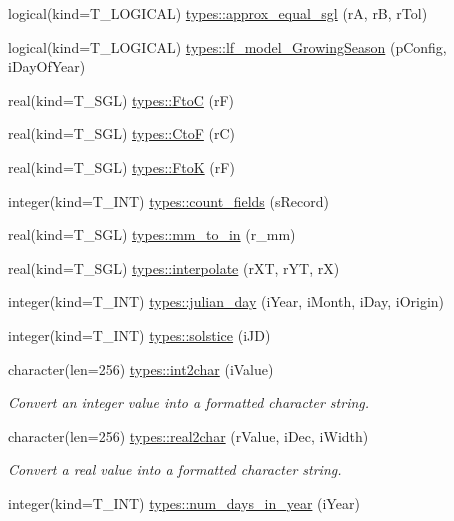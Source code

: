 \begin{DoxyCompactItemize}
\item 
logical(kind=T\_\-LOGICAL) \hyperlink{namespacetypes_a60490ed5b6b7d5903a034d5e531538db}{types::approx\_\-equal\_\-sgl} (rA, rB, rTol)
\item 
logical(kind=T\_\-LOGICAL) \hyperlink{namespacetypes_ae89a23df854f9f89cad1ced3667b267a}{types::lf\_\-model\_\-GrowingSeason} (pConfig, iDayOfYear)
\item 
real(kind=T\_\-SGL) \hyperlink{namespacetypes_a1ac08c4c46c18fd254270b91881836cd}{types::FtoC} (rF)
\item 
real(kind=T\_\-SGL) \hyperlink{namespacetypes_adc61e2bd06f7763a41664635cd792fa8}{types::CtoF} (rC)
\item 
real(kind=T\_\-SGL) \hyperlink{namespacetypes_a6d9d8e8b7f4594406e117e925a28ed71}{types::FtoK} (rF)
\item 
integer(kind=T\_\-INT) \hyperlink{namespacetypes_afb2b5df966d0995a0ef41180e05a0dc1}{types::count\_\-fields} (sRecord)
\item 
real(kind=T\_\-SGL) \hyperlink{namespacetypes_a6656bdb69c63e89fc6a5a56171dab67b}{types::mm\_\-to\_\-in} (r\_\-mm)
\item 
real(kind=T\_\-SGL) \hyperlink{namespacetypes_a7099d6b490c7a33120d4d9976142f72c}{types::interpolate} (rXT, rYT, rX)
\item 
integer(kind=T\_\-INT) \hyperlink{namespacetypes_a5f9e09099f47bada40db4475ee5778ae}{types::julian\_\-day} (iYear, iMonth, iDay, iOrigin)
\item 
integer(kind=T\_\-INT) \hyperlink{namespacetypes_a9b6e5619a6384f5bf6c383f273414f55}{types::solstice} (iJD)
\item 
character(len=256) \hyperlink{namespacetypes_ac81e1d5f7a39f96a2b492f098c2ba2e7}{types::int2char} (iValue)
\begin{DoxyCompactList}\small\item\em Convert an integer value into a formatted character string. \item\end{DoxyCompactList}\item 
character(len=256) \hyperlink{namespacetypes_afcafa126194a2f1c3236f7edfb62c38d}{types::real2char} (rValue, iDec, iWidth)
\begin{DoxyCompactList}\small\item\em Convert a real value into a formatted character string. \item\end{DoxyCompactList}\item 
integer(kind=T\_\-INT) \hyperlink{namespacetypes_ab9e5596db13055bdc0bc6008dfb3b946}{types::num\_\-days\_\-in\_\-year} (iYear)

\end{DoxyCompactItemize}
